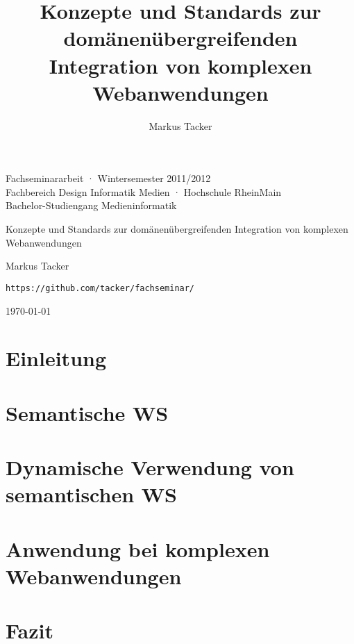 \documentclass[10pt,a4paper]{article}
\begin{document}
\author{Markus Tacker}
\title{Konzepte und Standards zur domänenübergreifenden Integration von komplexen Webanwendungen}

\begin{center}

\begin{small}Fachseminararbeit · Wintersemester 2011/2012\\Fachbereich Design Informatik Medien · Hochschule RheinMain\\Bachelor-Studiengang Medieninformatik\end{small}

\bigskip

\begin{huge}Konzepte und Standards 
\medskip
zur domänenübergreifenden Integration
\medskip
von komplexen Webanwendungen\end{huge}

\bigskip

\begin{large}Markus Tacker\end{large}

\begin{small}\texttt{https://github.com/tacker/fachseminar/}\end{small}

\today

\end{center}



\pagebreak

\tableofcontents

\section{Einleitung}
\label{l:einleitung}


\section{Semantische \acl{WS}}
\label{l:sem-web-ser}


\section{Dynamische Verwendung von semantischen \acl{WS}}
\label{l:loesungen}


\section{Anwendung bei komplexen Webanwendungen}
\label{l:verwendung}
% 

\section{Fazit}
\label{l:fazit}
% 

\pagebreak




\end{document}
